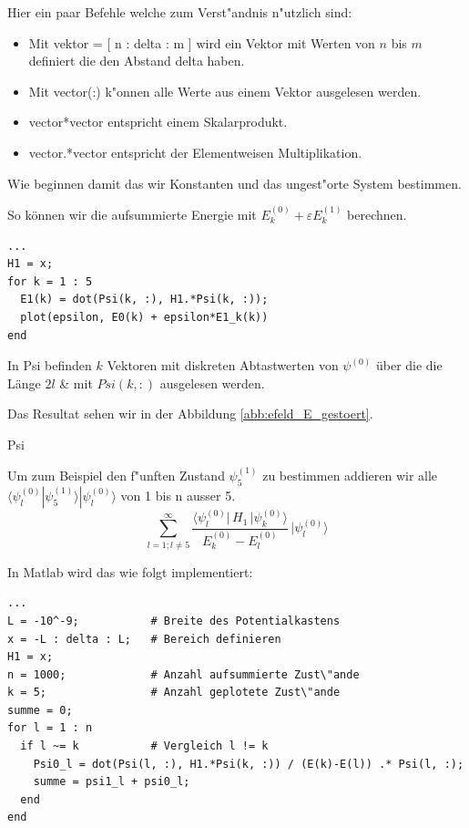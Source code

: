 \begin{refsection}
Hier ein paar Befehle welche zum Verst"andnis n"utzlich sind:
\begin{itemize}
\item Mit vektor = [ n : delta : m ] wird ein Vektor mit Werten von $n$ bis $m$ definiert die den Abstand delta haben.
\item Mit vector(:) k"onnen alle Werte aus einem Vektor ausgelesen werden.
\item vector*vector entspricht einem Skalarprodukt.
\item vector.*vector entspricht der Elementweisen Multiplikation.
\end{itemize}

Wie beginnen damit das wir Konstanten und das ungest"orte System bestimmen.





So k\"onnen wir die aufsummierte Energie mit $E_k^{(0)} + \varepsilon E_k^{(1)}$ berechnen.

\begin{lstlisting}[style=Matlab]
...
H1 = x;
for k = 1 : 5
  E1(k) = dot(Psi(k, :), H1.*Psi(k, :));
  plot(epsilon, E0(k) + epsilon*E1_k(k))
end
\end{lstlisting}
In Psi befinden $k$ Vektoren mit diskreten Abtastwerten von $\psi^{(0)}$ \"uber die die L\"ange $2l$
\& mit $Psi(k, :)$ ausgelesen werden.

Das Resultat sehen wir in der Abbildung \ref{abb:efeld_E_gestoert}.

Psi

Um zum Beispiel den f"unften Zustand $\psi_5^{(1)}$ zu bestimmen addieren wir alle 
$\langle\psi_l^{(0)}|\psi_5^{(1)}\rangle|\psi_l^{(0)}\rangle$
 von 1 bis n ausser 5.
\begin{equation}
  \sum_{l=1 ; l\ne 5}^{\infty}
    \frac{\langle \psi_l^{(0)}|\, H_1 \,|\psi_k^{(0)}\rangle}{E_k^{(0)}-E_l^{(0)}}
        \,
    |\psi_l^{(0)}\rangle
\end{equation}

In Matlab wird das wie folgt implementiert:
\begin{lstlisting}[style=Matlab]
...
L = -10^-9;           # Breite des Potentialkastens
x = -L : delta : L;   # Bereich definieren
H1 = x;               
n = 1000;             # Anzahl aufsummierte Zust\"ande
k = 5;                # Anzahl geplotete Zust\"ande
summe = 0;
for l = 1 : n
  if l ~= k           # Vergleich l != k
    Psi0_l = dot(Psi(l, :), H1.*Psi(k, :)) / (E(k)-E(l)) .* Psi(l, :);
    summe = psi1_l + psi0_l;
  end
end
\end{lstlisting} %


\end{refsection}
